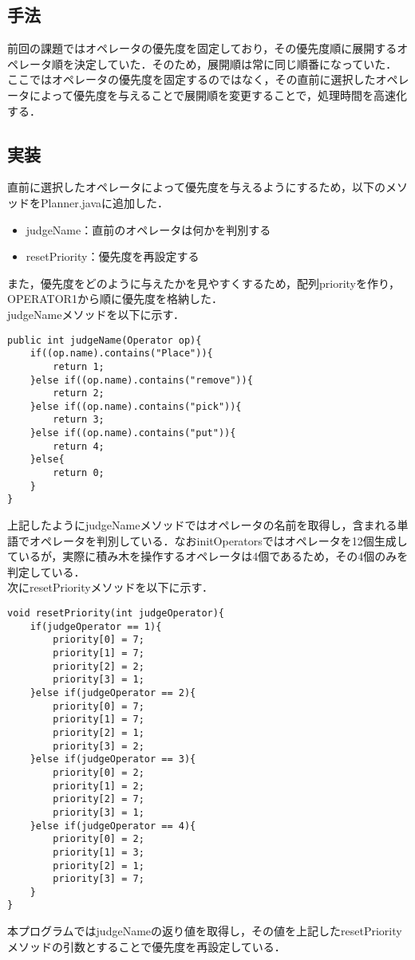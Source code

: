 \documentclass[a4j]{jarticle}
\begin{document}
\subsection{手法}
前回の課題ではオペレータの優先度を固定しており，その優先度順に展開するオペレータ順を決定していた．そのため，展開順は常に同じ順番になっていた．
ここではオペレータの優先度を固定するのではなく，その直前に選択したオペレータによって優先度を与えることで展開順を変更することで，処理時間を高速化する．

\subsection{実装}
直前に選択したオペレータによって優先度を与えるようにするため，以下のメソッドをPlanner.javaに追加した．
\begin{itemize}
\item judgeName：直前のオペレータは何かを判別する
\item resetPriority：優先度を再設定する
\end{itemize}
また，優先度をどのように与えたかを見やすくするため，配列priorityを作り，OPERATOR1から順に優先度を格納した．\\
judgeNameメソッドを以下に示す．
\begin{lstlisting}
public int judgeName(Operator op){
	if((op.name).contains("Place")){
		return 1;
	}else if((op.name).contains("remove")){
		return 2;
	}else if((op.name).contains("pick")){
		return 3;
	}else if((op.name).contains("put")){
		return 4;
	}else{
		return 0;
	}
}
\end{lstlisting}
上記したようにjudgeNameメソッドではオペレータの名前を取得し，含まれる単語でオペレータを判別している．なおinitOperatorsではオペレータを12個生成しているが，実際に積み木を操作するオペレータは4個であるため，その4個のみを判定している．\\
次にresetPriorityメソッドを以下に示す．
\begin{lstlisting}
void resetPriority(int judgeOperator){
	if(judgeOperator == 1){
		priority[0] = 7;
		priority[1] = 7;
		priority[2] = 2;
		priority[3] = 1;
	}else if(judgeOperator == 2){
		priority[0] = 7;
		priority[1] = 7;
		priority[2] = 1;
		priority[3] = 2;
	}else if(judgeOperator == 3){
		priority[0] = 2;
		priority[1] = 2;
		priority[2] = 7;
		priority[3] = 1;
	}else if(judgeOperator == 4){
		priority[0] = 2;
		priority[1] = 3;
		priority[2] = 1;
		priority[3] = 7;
	}
}
\end{lstlisting}
本プログラムではjudgeNameの返り値を取得し，その値を上記したresetPriorityメソッドの引数とすることで優先度を再設定している．
\end{document}

